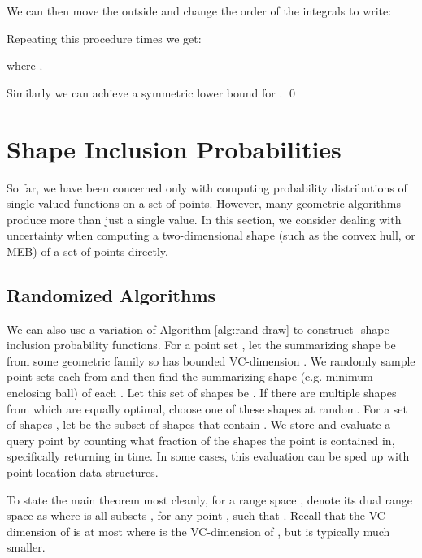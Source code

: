 \documentclass{journal}
\begin{document}
We can then move the  outside and change the order of the integrals to write:

Repeating this procedure  times we get:

where .

Similarly we can achieve a symmetric lower bound for .  \qed
























\section {Shape Inclusion Probabilities}

So far, we have been concerned only with computing probability distributions of single-valued functions on a set of points. However, many geometric algorithms produce more than just a single value. In this section, we consider dealing with uncertainty when computing a two-dimensional shape (such as the convex hull, or MEB) of a set of points directly.


\subsection{Randomized Algorithms}
We can also use a variation of Algorithm \ref{alg:rand-draw} to construct -shape inclusion probability functions.
For a point set , let the summarizing shape  be from some geometric family  so  has bounded VC-dimension .
We randomly sample  point sets  each from  and then find the summarizing shape  (e.g. minimum enclosing ball) of each .  Let this set of shapes be .  If there are multiple shapes from  which are equally optimal, choose one of these shapes at random.
For a set of shapes , let  be the subset of shapes that contain .
We store  and evaluate a query point  by counting what fraction of the shapes the point is contained in, specifically returning  in  time.  In some cases, this evaluation can be sped up with point location data structures.

To state the main theorem most cleanly, for a range space , denote its dual range space as  where  is all subsets , for any point , such that .  Recall that the VC-dimension  of  is at most  where  is the VC-dimension of , but is typically much smaller.  
\end{document}
